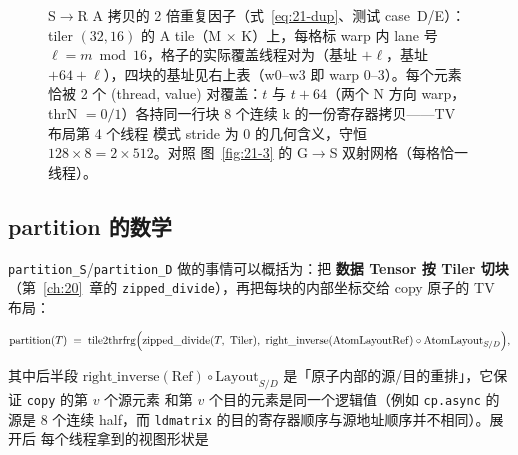 \begin{figure}[H]
\caption{S$\to$R A 拷贝的 2 倍重复因子（式~\eqref{eq:21-dup}、测试
case~D/E）：tiler $(32,16)$ 的 A tile（M $\times$ K）上，每格标 warp 内
lane 号 $\ell=m\bmod16$，格子的实际覆盖线程对为（基址 $+\ell$，基址
$+64+\ell$），四块的基址见右上表（w0--w3 即 warp 0--3）。每个元素恰被
2 个 (thread, value) 对覆盖：$t$ 与 $t{+}64$（两个 N 方向 warp，thrN
$=0/1$）各持同一行块 8 个连续 k 的一份寄存器拷贝——TV 布局第 4 个线程
模式 stride 为 0 的几何含义，守恒 $128\times8=2\times512$。对照
图~\ref{fig:21-3} 的 G$\to$S 双射网格（每格恰一线程）。}
\label{fig:21-s2r-dup}
\end{figure}

\subsection{partition 的数学}

\texttt{partition\_S}/\texttt{partition\_D} 做的事情可以概括为：把
\textbf{数据 Tensor 按 Tiler 切块}（第~\ref{ch:20}~章的
\texttt{zipped\_\allowbreak{}divide}），再把每块的内部坐标交给 copy 原子的 TV 布局：

\begin{equation}
  \mathrm{partition}(T) \;=\;
  \mathrm{tile2thrfrg}\Bigl(
    \mathrm{zipped\_divide}(T,\ \mathrm{Tiler}),
    \ \mathrm{right\_inverse}(\mathrm{AtomLayoutRef}) \circ \mathrm{AtomLayout}_{S/D}
  \Bigr),
  \label{eq:21-partition}
\end{equation}

其中后半段 $\mathrm{right\_inverse}(\mathrm{Ref})\circ\mathrm{Layout}_{S/D}$
是「原子内部的源/目的重排」，它保证 \texttt{copy} 的第 $v$ 个源元素
和第 $v$ 个目的元素是同一个逻辑值（例如 \texttt{cp.async} 的源是 8 个连续
half，而 \texttt{ldmatrix} 的目的寄存器顺序与源地址顺序并不相同）。展开后
每个线程拿到的视图形状是

